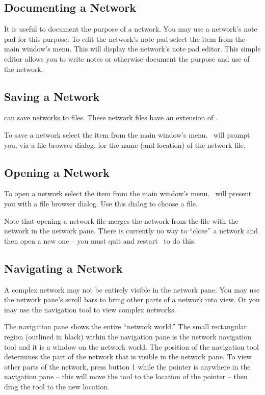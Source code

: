 \subsection{Documenting a Network}
\label{sec:docnetwork}

It is useful to document the purpose of a network.  You may use a network's
note pad for this purpose.  To edit the network's note pad select the
 item from the main window's  menu.  This
will display the network's note pad editor.  This simple editor allows you
to write notes or otherwise document the purpose and use of the network.


\subsection{Saving a Network}
\label{sec:savenet}

\sr can save networks to files.  These network files have an extension of
.  

To save a network select the  item from the main window's
 menu.  \sr\ will prompt you, via a file browser dialog, for the
name (and location) of the network file.


\subsection{Opening a Network}
\label{sec:opennet}

To open a network select the  item from the main window's
 menu.  \sr\ will present you with a file browser dialog.
Use this dialog to choose a  file.

Note that opening a network file merges the network from the file with the
network in the network pane.  There is currently no way to ``close'' a
network and then open a new one -- you must quit and restart \sr\ to do
this.

\subsection{Navigating a Network}
\label{sec:navnetwork}

A complex network may not be entirely visible in the network pane.  You may
use the network pane's scroll bars to bring other parts of a network into
view.  Or you may use the navigation tool to view complex networks.

The navigation pane shows the entire ``network world.''  The small
rectangular region (outlined in black) within the navigation pane is the
network navigation tool and it is a window on the network world.  The
position of the navigation tool determines the part of the network that is
visible in the network pane.  To view other parts of the network, press
button 1 while the pointer is anywhere in the navigation pane -- this will
move the tool to the location of the pointer --  then drag the tool to the
new location.



